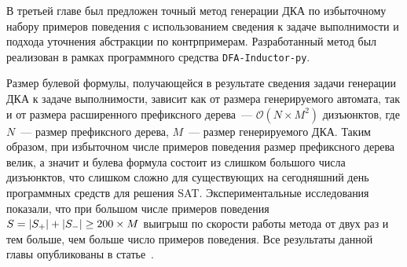 
\chresults{\ref{sec:cegar}}

В третьей главе был предложен точный метод генерации ДКА по избыточному набору примеров поведения с использованием сведения к задаче выполнимости и подхода уточнения абстракции по контрпримерам.
Разработанный метод был реализован в рамках программного средства \texttt{DFA-Inductor-py}.

Размер булевой формулы, получающейся в результате сведения задачи генерации ДКА к задаче выполнимости, зависит как от размера генерируемого автомата, так и от размера расширенного префиксного дерева~--- $\mathcal{O}\left(N \times M^{2}\right)$ дизъюнктов, где $N$~--- размер префиксного дерева, $M$~--- размер генерируемого ДКА.
Таким образом, при избыточном числе примеров поведения размер префиксного дерева велик, а значит и булева формула состоит из слишком большого числа дизъюнктов, что слишком сложно для существующих на сегодняшний день программных средств для решения SAT.
Экспериментальные исследования показали, что при большом числе примеров поведения $S=\lvert S_{+}\rvert+\lvert S_{-}\rvert \geq 200 \times M$ выигрыш по скорости работы метода от двух раз и тем больше, чем больше число примеров поведения.
Все результаты данной главы опубликованы в статье~\cite{zakirzyanov2020Vestnik}.